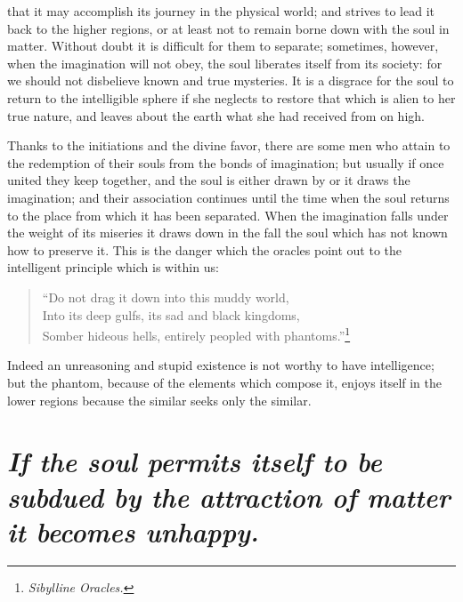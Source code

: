 \documentclass[12pt]{article}
\begin{document}
that it may accomplish its journey in the physical world; and strives to lead
it back to the higher regions, or at least not to remain borne down with the
soul in matter. Without doubt it is difficult for them to separate; sometimes,
however, when the imagination will not obey, the soul liberates itself from its
society: for we should not disbelieve known and true mysteries. It is a
disgrace for the soul to return to the intelligible sphere if she neglects to
restore that which is alien to her true nature, and leaves about the earth
what she had received from on high.

Thanks to the initiations and the divine favor, there are some men who attain
to the redemption of their souls from the bonds of imagination; but usually if
once united they keep together, and the soul is either drawn by or it draws the
imagination; and their association continues until the time when the soul
returns to the place from which it has been separated. When the imagination
falls under the weight of its miseries it draws down in the fall the soul which
has not known how to preserve it. This is the danger which the oracles point
out to the intelligent principle which is within us:

\begin{verse}
``Do not drag it down into this muddy world,\\
Into its deep gulfs, its sad and black kingdoms,\\
Somber hideous hells, entirely peopled with
phantoms.''\footnote{\textit{Sibylline Oracles.}}
\end{verse}

\noindent Indeed an unreasoning and stupid existence is not worthy to have
intelligence; but the phantom, because of the elements which compose it, enjoys
itself in the lower regions because the similar seeks only the similar.


\section{\mdseries\itshape If the soul permits itself to be subdued by the
attraction of matter it becomes unhappy.}
\end{document}
